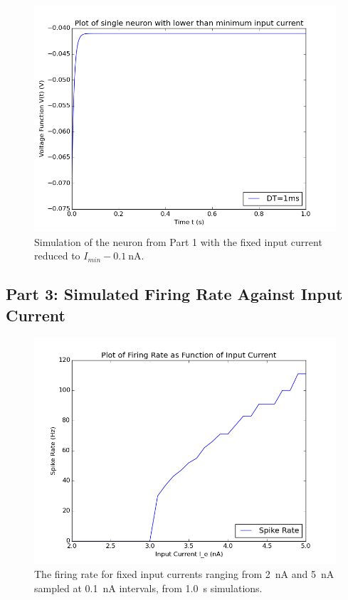 \documentclass[a4paper, 10pt]{article}
\begin{document}
\begin{figure}[H]
  \centering
  \includegraphics[scale=0.4]{p2b.png}
  \caption{Simulation of the neuron from Part 1 with the fixed input current reduced to \(I_{min} - \SI{0.1}{\nano\ampere}\).}
\end{figure}

\subsection*{Part 3: Simulated Firing Rate Against Input Current}

\begin{figure}[H]
  \centering
  \includegraphics[scale=0.4]{p3.png}
  \caption{The firing rate for fixed input currents ranging from \SI{2}{\nano\ampere} and \SI{5}{\nano\ampere} sampled at \SI{0.1}{\nano\ampere} intervals, from \SI{1.0}{\second} simulations.}
\end{figure}
\end{document}
